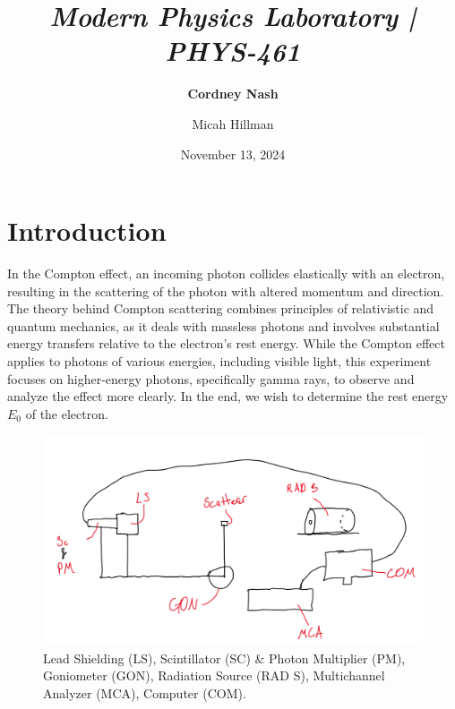 \documentclass[a4paper,12pt,english]{all-in-one} %
\title{{\large\textit{Modern Physics Laboratory | PHYS-461}}\\[0.5cm]{\Huge\color{gray}\textsc{\@docsubtitle}}}
\author{\textbf{Cordney Nash}  \and Micah Hillman  }
\date{November 13, 2024}
\begin{document}
\begin{titlepage}
\maketitle\vfill
\end{titlepage}
\newpage


\section*{Introduction}
{
In the Compton effect, an incoming photon collides elastically with an electron, resulting in the scattering of the photon with altered momentum and direction. The theory behind Compton scattering combines principles of relativistic and quantum mechanics, as it deals with massless photons and involves substantial energy transfers relative to the electron’s rest energy. While the Compton effect applies to photons of various energies, including visible light, this experiment focuses on higher-energy photons, specifically gamma rays, to observe and analyze the effect more clearly. In the end, we wish to determine the rest energy $E_0$ of the electron.
}

\begin{figure}[tbh]
    \centering
    \includegraphics[width=0.8\linewidth]{6-compton/images/Screenshot from 2024-11-16 17-29-02.png}
    \caption{ \scriptsize{ Lead Shielding (LS), Scintillator (SC) \& Photon Multiplier (PM), Goniometer (GON), Radiation Source (RAD S), Multichannel Analyzer (MCA), Computer (COM).
    }}
    \label{fig:compton-diagram}
\end{figure}
\end{document}
